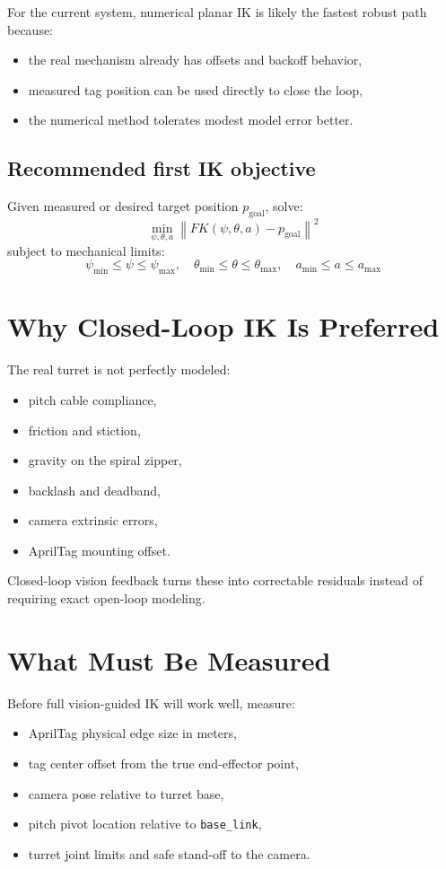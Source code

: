 \documentclass[11pt]{article}
\begin{document}
For the current system, numerical planar IK is likely the fastest robust path because:
\begin{itemize}[leftmargin=1.5em]
  \item the real mechanism already has offsets and backoff behavior,
  \item measured tag position can be used directly to close the loop,
  \item the numerical method tolerates modest model error better.
\end{itemize}

\subsection*{Recommended first IK objective}
Given measured or desired target position \(p_{\text{goal}}\), solve:
\[
\min_{\psi,\theta,a} \left\| FK(\psi,\theta,a) - p_{\text{goal}} \right\|^2
\]
subject to mechanical limits:
\[
\psi_{\min} \le \psi \le \psi_{\max}, \quad
\theta_{\min} \le \theta \le \theta_{\max}, \quad
a_{\min} \le a \le a_{\max}
\]

\section*{Why Closed-Loop IK Is Preferred}
The real turret is not perfectly modeled:
\begin{itemize}[leftmargin=1.5em]
  \item pitch cable compliance,
  \item friction and stiction,
  \item gravity on the spiral zipper,
  \item backlash and deadband,
  \item camera extrinsic errors,
  \item AprilTag mounting offset.
\end{itemize}

Closed-loop vision feedback turns these into correctable residuals instead of requiring exact open-loop modeling.

\section*{What Must Be Measured}
Before full vision-guided IK will work well, measure:
\begin{itemize}[leftmargin=1.5em]
  \item AprilTag physical edge size in meters,
  \item tag center offset from the true end-effector point,
  \item camera pose relative to turret base,
  \item pitch pivot location relative to \texttt{base\_link},
  \item turret joint limits and safe stand-off to the camera.
\end{itemize}
\end{document}

